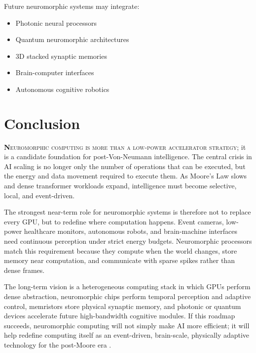 \documentclass[11pt]{article}
\newcommand{\sectionlead}[2]{\noindent\lettrine[lines=2,lhang=0.08,nindent=0.12em]{\textcolor{IEEEblue}{\bfseries #1}}{\hspace{0.03em}#2}}
\begin{document}
\begin{futurebox}
Future neuromorphic systems may integrate:
\begin{itemize}
    \item Photonic neural processors
    \item Quantum neuromorphic architectures
    \item 3D stacked synaptic memories
    \item Brain-computer interfaces
    \item Autonomous cognitive robotics
\end{itemize}
\end{futurebox}

\section{Conclusion}
\sectionlead{N}{euromorphic computing is more than a low-power accelerator strategy}; it is a candidate foundation for post-Von-Neumann intelligence. The central crisis in AI scaling is no longer only the number of operations that can be executed, but the energy and data movement required to execute them. As Moore's Law slows and dense transformer workloads expand, intelligence must become selective, local, and event-driven.

The strongest near-term role for neuromorphic systems is therefore not to replace every GPU, but to redefine where computation happens. Event cameras, low-power healthcare monitors, autonomous robots, and brain-machine interfaces need continuous perception under strict energy budgets. Neuromorphic processors match this requirement because they compute when the world changes, store memory near computation, and communicate with sparse spikes rather than dense frames.

The long-term vision is a heterogeneous computing stack in which GPUs perform dense abstraction, neuromorphic chips perform temporal perception and adaptive control, memristors store physical synaptic memory, and photonic or quantum devices accelerate future high-bandwidth cognitive modules. If this roadmap succeeds, neuromorphic computing will not simply make AI more efficient; it will help redefine computing itself as an event-driven, brain-scale, physically adaptive technology for the post-Moore era \cite{intel2024halapoint,schuman2017survey,burr2017nvm,shastri2021photonics}.

\newpage
\end{document}
